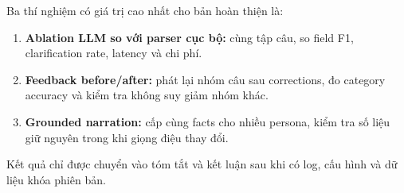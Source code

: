 Ba thí nghiệm có giá trị cao nhất cho bản hoàn thiện là:

\begin{enumerate}
  \item \textbf{Ablation LLM so với parser cục bộ:} cùng tập câu, so field F1, clarification rate, latency và chi phí.
  \item \textbf{Feedback before/after:} phát lại nhóm câu sau corrections, đo category accuracy và kiểm tra không suy giảm nhóm khác.
  \item \textbf{Grounded narration:} cấp cùng facts cho nhiều persona, kiểm tra số liệu giữ nguyên trong khi giọng điệu thay đổi.
\end{enumerate}

Kết quả chỉ được chuyển vào tóm tắt và kết luận sau khi có log, cấu hình và dữ liệu khóa phiên bản.
